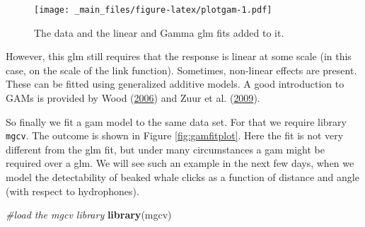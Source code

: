 \documentclass[]{book}
\newenvironment{Shaded}{\begin{snugshade}}{\end{snugshade}}
\newcommand{\KeywordTok}[1]{\textcolor[rgb]{0.13,0.29,0.53}{\textbf{#1}}}
\newcommand{\DataTypeTok}[1]{\textcolor[rgb]{0.13,0.29,0.53}{#1}}
\newcommand{\DecValTok}[1]{\textcolor[rgb]{0.00,0.00,0.81}{#1}}
\newcommand{\StringTok}[1]{\textcolor[rgb]{0.31,0.60,0.02}{#1}}
\newcommand{\CommentTok}[1]{\textcolor[rgb]{0.56,0.35,0.01}{\textit{#1}}}
\newcommand{\OperatorTok}[1]{\textcolor[rgb]{0.81,0.36,0.00}{\textbf{#1}}}
\newcommand{\NormalTok}[1]{#1}
\theoremstyle{definition}
\theoremstyle{definition}
\theoremstyle{remark}
\begin{document}
\begin{Shaded}
\end{Shaded}

\begin{figure}
\centering
\texttt{[image: \_main\_files/figure-latex/plotgam-1.pdf]}
\caption{\label{fig:plotgam}The data and the linear and Gamma glm fits added
to it.}
\end{figure}

However, this glm still requires that the response is linear at some
scale (in this case, on the scale of the link function). Sometimes,
non-linear effects are present. These can be fitted using generalized
additive models. A good introduction to GAMs is provided by Wood
(\protect\hyperlink{ref-Wood2006}{2006}) and Zuur et al.
(\protect\hyperlink{ref-Zuur2009b}{2009}).

So finally we fit a gam model to the same data set. For that we require
library \texttt{mgcv}. The outcome is shown in Figure
\ref{fig:gamfitplot}. Here the fit is not very different from the glm
fit, but under many circumstances a gam might be required over a glm. We
will see such an example in the next few days, when we model the
detectability of beaked whale clicks as a function of distance and angle
(with respect to hydrophones).

\begin{Shaded}
\begin{Highlighting}[]
\CommentTok{#load the mgcv library}
\KeywordTok{library}\NormalTok{(mgcv)}
\end{Highlighting}
\end{Shaded}
\end{document}
